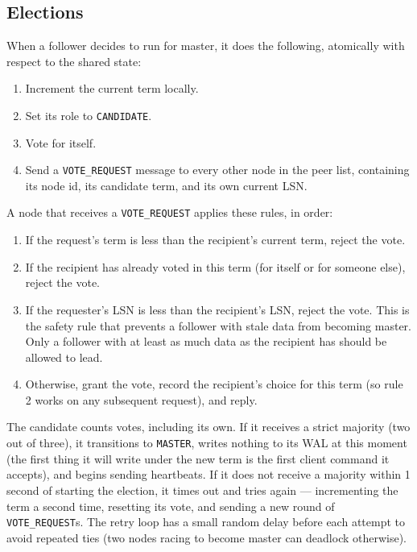 \documentclass[11pt,a4paper]{article}
\begin{document}
\subsection{Elections}
When a follower decides to run for master, it does the following, atomically with respect to the shared state:

\begin{enumerate}
\item Increment the current term locally.
\item Set its role to \texttt{CANDIDATE}.
\item Vote for itself.
\item Send a \texttt{VOTE\_REQUEST} message to every other node in the peer list, containing its node id, its candidate term, and its own current LSN.
\end{enumerate}

A node that receives a \texttt{VOTE\_REQUEST} applies these rules, in order:

\begin{enumerate}
\item If the request's term is less than the recipient's current term, reject the vote.
\item If the recipient has already voted in this term (for itself or for someone else), reject the vote.
\item If the requester's LSN is less than the recipient's LSN, reject the vote. This is the safety rule that prevents a follower with stale data from becoming master. Only a follower with at least as much data as the recipient has should be allowed to lead.
\item Otherwise, grant the vote, record the recipient's choice for this term (so rule 2 works on any subsequent request), and reply.
\end{enumerate}

The candidate counts votes, including its own. If it receives a strict majority (two out of three), it transitions to \texttt{MASTER}, writes nothing to its WAL at this moment (the first thing it will write under the new term is the first client command it accepts), and begins sending heartbeats. If it does not receive a majority within 1 second of starting the election, it times out and tries again --- incrementing the term a second time, resetting its vote, and sending a new round of \texttt{VOTE\_REQUEST}s. The retry loop has a small random delay before each attempt to avoid repeated ties (two nodes racing to become master can deadlock otherwise).
\end{document}

